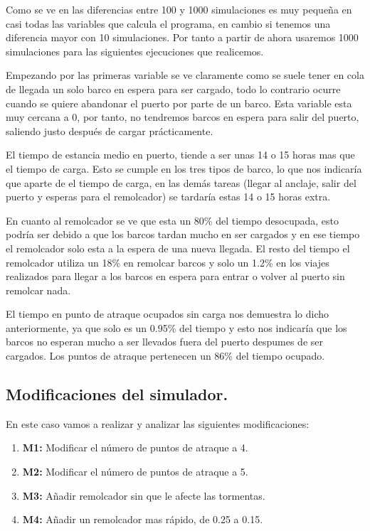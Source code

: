\documentclass[]{article}
\begin{document}
Como se ve en las diferencias entre 100 y 1000 simulaciones es muy pequeña en casi todas las variables que calcula el programa, en cambio si tenemos una diferencia mayor con 10 simulaciones. Por tanto a partir de ahora usaremos 1000 simulaciones para las siguientes ejecuciones que realicemos. 
\newline

Empezando por las primeras variable se ve claramente como se suele tener en cola de llegada un solo barco en espera para ser cargado, todo lo contrario ocurre cuando se quiere abandonar el puerto por parte de un barco. Esta variable esta muy cercana a 0, por tanto, no tendremos barcos en espera para salir del puerto, saliendo justo después de cargar prácticamente. 
\newline

El tiempo de estancia medio en puerto, tiende a ser unas 14 o 15 horas mas que el tiempo de carga. Esto se cumple en los tres tipos de barco, lo que nos indicaría que aparte de el tiempo de carga, en las demás tareas (llegar al anclaje, salir del puerto y esperas para el remolcador) se tardaría estas 14 o 15 horas extra.
\newline

En cuanto al remolcador se ve que esta un 80\% del tiempo desocupada, esto podría ser debido a que los barcos tardan mucho en ser cargados y en ese tiempo el remolcador solo esta a la espera de una nueva llegada. El resto del tiempo el remolcador utiliza un 18\% en remolcar barcos y solo un 1.2\% en los viajes realizados para llegar a los barcos en espera para entrar o volver al puerto sin remolcar nada. 
\newline

El tiempo en punto de atraque ocupados sin carga nos demuestra lo dicho anteriormente, ya que solo es un 0.95\% del tiempo y esto nos indicaría que los barcos no esperan mucho a ser llevados fuera del puerto despumes de ser cargados. 
Los puntos de atraque pertenecen un 86\% del tiempo ocupado. 

\subsection{Modificaciones del simulador.}
En este caso vamos a realizar y analizar las siguientes modificaciones:
\begin{enumerate}
	\item \textbf{M1:} Modificar el número de puntos de atraque a 4.
	\item \textbf{M2:} Modificar el número de puntos de atraque a 5.
	\item \textbf{M3:} Añadir remolcador sin que le afecte las tormentas.
	\item \textbf{M4:} Añadir un remolcador mas rápido, de 0.25 a 0.15.
\end{enumerate}
\end{document}
